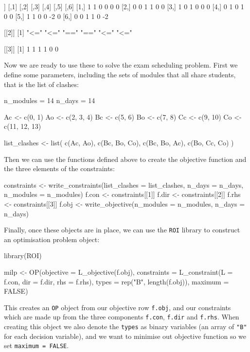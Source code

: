 \begin{Rout-no-test}
[[1]]
     [,1] [,2] [,3] [,4] [,5] [,6]
[1,]    1    1    0    0    0    0
[2,]    0    0    1    1    0    0
[3,]    1    0    1    0    0    0
[4,]    0    1    0    1    0    0
[5,]    1    1    0    0   -2    0
[6,]    0    0    1    1    0   -2

[[2]]
[1] "<=" "<=" "==" "==" "<=" "<="

[[3]]
[1] 1 1 1 1 0 0
\end{Rout-no-test}

Now we are ready to use these to solve the exam scheduling problem.
First we define some parameters, including the sets of modules that all share
students, that is the list of clashes:

\begin{Rin-no-test}
n_modules = 14
n_days = 14

Ac <- c(0, 1)
Ao <- c(2, 3, 4)
Bc <- c(5, 6)
Bo <- c(7, 8)
Cc <- c(9, 10)
Co <- c(11, 12, 13)

list_clashes <- list(
  c(Ac, Ao),
  c(Bc, Bo, Co),
  c(Bc, Bo, Ac),
  c(Bo, Cc, Co)
)
\end{Rin-no-test}

Then we can use the functions defined above to create the objective function and
the three elements of the constraints:

\begin{Rin-no-test}
constraints <- write_constraints(list_clashes = list_clashes,
                                 n_days = n_days,
                                 n_modules = n_modules)
f.con <- constraints[[1]]
f.dir <- constraints[[2]]
f.rhs <- constraints[[3]]
f.obj <- write_objective(n_modules = n_modules, n_days = n_days)
\end{Rin-no-test}

Finally, once these objects are in place, we can use the
\texttt{ROI} library to construct an optimisation problem object:

\begin{Rin-no-test}
library(ROI)

milp <- OP(objective = L_objective(f.obj),
           constraints = L_constraint(L = f.con,
                                      dir = f.dir,
                                      rhs = f.rhs),
           types = rep("B", length(f.obj)), 
           maximum = FALSE)
\end{Rin-no-test}

This creates an \texttt{OP} object from our objective row
\texttt{f.obj}, and our constraints which are made up from the three
components \texttt{f.con}, \texttt{f.dir} and
\texttt{f.rhs}.
When creating this object we also denote the \texttt{types} as binary
variables (an array of \texttt{"B"} for each decision variable), and we
want to minimise out objective function so we set
\texttt{maximum = FALSE}.

